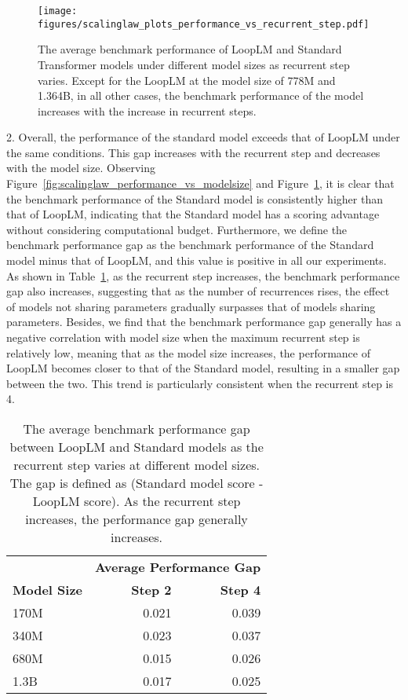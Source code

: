 \documentclass[]{bytedance_seed}
\newcommand{\1}{\mathbf{1}}
\newcommand{\ut}{LoopLM}
\begin{document}
\begin{figure}[htbp!]
    \centering
    \texttt{[image: figures/scalinglaw\_plots\_performance\_vs\_recurrent\_step.pdf]}
    \caption{The average benchmark performance of \ut{} and Standard Transformer models under different model sizes as recurrent step varies. Except for the \ut{} at the model size of 778M and 1.364B, in all other cases, the benchmark performance of the model increases with the increase in recurrent steps.}
    \label{fig:scalinglaw_performance_vs_recurrentstep}
\end{figure}

2. Overall, the performance of the standard model exceeds that of \ut{} under the same conditions. This gap increases with the recurrent step and decreases with the model size. Observing Figure~\ref{fig:scalinglaw_performance_vs_modelsize} and Figure~\ref{fig:scalinglaw_performance_vs_recurrentstep}, it is clear that the benchmark performance of the Standard model is consistently higher than that of \ut{}, indicating that the Standard model has a scoring advantage without considering computational budget. Furthermore, we define the benchmark performance gap as the benchmark performance of the Standard model minus that of \ut{}, and this value is positive in all our experiments. As shown in Table~\ref{tab:scalinglaw_performancegap}, as the recurrent step increases, the benchmark performance gap also increases, suggesting that as the number of recurrences rises, the effect of models not sharing parameters gradually surpasses that of models sharing parameters. Besides, we find that the benchmark performance gap generally has a negative correlation with model size when the maximum recurrent step is relatively low, meaning that as the model size increases, the performance of \ut{} becomes closer to that of the Standard model, resulting in a smaller gap between the two. This trend is particularly consistent when the recurrent step is 4.

\begin{table}[htbp!]
    \centering
    \small
    \caption{The average benchmark performance gap between \ut{} and Standard models as the recurrent step varies at different model sizes. The gap is defined as (Standard model score - \ut{} score). As the recurrent step increases, the performance gap generally increases.}
    \label{tab:scalinglaw_performancegap}
    \begin{tabular}{@{}lrr@{}}
    \toprule
     & \multicolumn{2}{c}{\textbf{Average Performance Gap}} \\
    \cmidrule(lr){2-3}
    \textbf{Model Size} & \textbf{Step 2} & \textbf{Step 4} \\
    \midrule
    170M & 0.021 & 0.039 \\
    340M & 0.023 & 0.037 \\
    680M & 0.015 & 0.026 \\
    1.3B & 0.017 & 0.025 \\
    \bottomrule
    \end{tabular}
\end{table}
\end{document}
